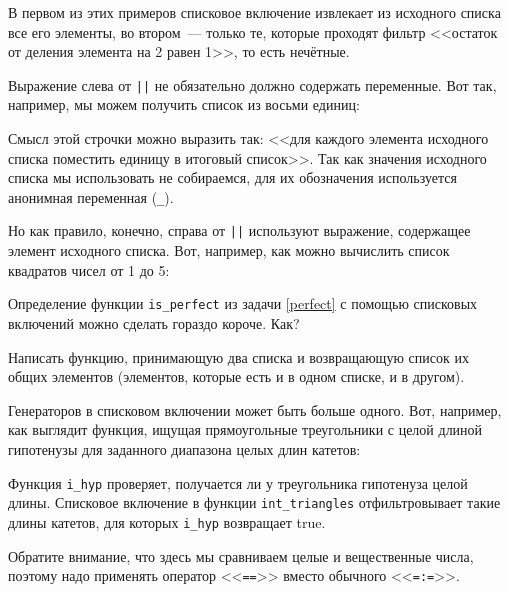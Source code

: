 \documentclass[
  paper=a4,
  fontsize=14pt,
  openany,
  appendixprefix=true
]{scrbook}
\begin{document}
В первом из этих примеров списковое включение извлекает из исходного списка все его элементы, во втором~--- только те, которые проходят фильтр <<остаток от деления элемента на 2 равен 1>>, то есть нечётные.

Выражение слева от \lstinline{||} не обязательно должно содержать переменные. Вот так, например, мы можем получить список из восьми единиц:


Смысл этой строчки можно выразить так: <<для каждого элемента исходного списка поместить единицу в итоговый список>>. Так как значения исходного списка мы использовать не собираемся, для их обозначения используется анонимная переменная (\lstinline{_}).

Но как правило, конечно, справа от \lstinline{||} используют выражение, содержащее элемент исходного списка. Вот, например, как можно вычислить список квадратов чисел от 1 до 5:


\begin{problem}\label{short_perfect}
Определение функции \lstinline{is_perfect} из задачи \ref{perfect} с помощью списковых включений можно сделать гораздо короче. Как?
\end{problem}
\begin{problem}\label{common}
Написать функцию, принимающую два списка и возвращающую список их общих элементов (элементов, которые есть и в одном списке, и в другом).
\end{problem}

Генераторов в списковом включении может быть больше одного. Вот, например, как выглядит функция, ищущая прямоугольные треугольники с целой длиной гипотенузы для заданного диапазона целых длин катетов:


Функция \lstinline{i_hyp} проверяет, получается ли у треугольника гипотенуза целой длины. Списковое включение в функции \lstinline{int_triangles} отфильтровывает такие длины катетов, для которых \lstinline{i_hyp} возвращает true.

Обратите внимание, что здесь мы сравниваем целые и вещественные числа, поэтому надо применять оператор <<\lstinline{==}>> вместо обычного <<\lstinline{=:=}>>.
\end{document}
